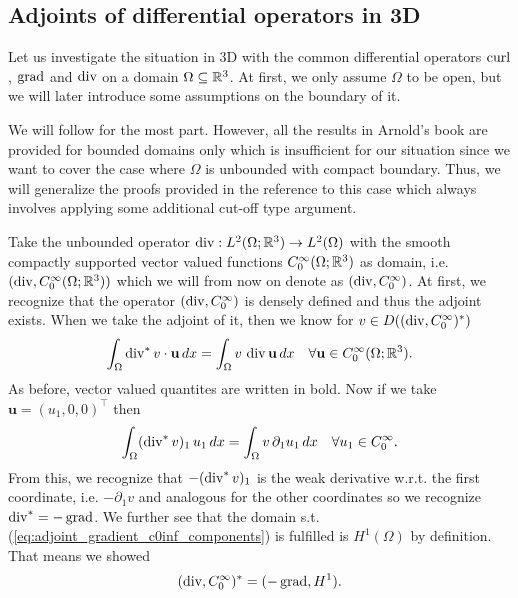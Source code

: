 \documentclass[../master_thesis.tex]{subfiles}
\begin{document}
\subsection{Adjoints of differential operators in 3D}\label{sec:adjoints_differential_operators_3d}

Let us investigate the situation in 3D with the common differential 
operators $\operatorname{curl}$, $\operatorname{grad}$ and $\operatorname{div}$ on a domain $\Omega \subseteq \mathbb{R}^3$. 
At first, we only assume  $\Omega$ to be open, but we will later 
introduce some assumptions on the boundary of it. 


We will follow \cite[Sec.\,3.4]{arnold} for the most part. However, all the results in Arnold's book 
are provided for bounded domains only which is insufficient for our situation since 
we want to cover the case where $\Omega$ is unbounded with compact boundary. Thus, 
we will generalize the proofs provided in the reference to this case which always involves 
applying some additional cut-off type argument.

Take the unbounded operator 
$\operatorname{div}: L^2(\Omega;\mathbb{R}^3) \rightarrow L^2(\Omega)$ with the smooth compactly supported 
vector valued functions
$C_0^\infty(\Omega;\mathbb{R}^3)$ as domain, i.e. $(\operatorname{div}, C_0^\infty(\Omega;\mathbb{R}^3))$ which 
we will from now on denote as $(\operatorname{div}, C_0^\infty)$. At first, we recognize that 
the operator $(\operatorname{div}, C_0^\infty)$ is densely defined and thus the adjoint exists.
When we take the adjoint of it, then we know for $v \in 
D((\operatorname{div}, C_0^\infty)^*)$
\begin{align*}
    \int_\Omega \operatorname{div} ^* v \cdot \mathbf{u} \, dx
    = \int_\Omega v \, \operatorname{div} \mathbf{u} \, dx \quad \forall 
    \mathbf{u} \in C_0^\infty(\Omega;\mathbb{R}^3).
\end{align*}
As before, vector valued quantites are written in bold.
Now if we take $\mathbf{u} = (u_1,0,0)^\top$ then 
\begin{align}
    \int_\Omega (\operatorname{div} ^* v)_1 \, u_1 \, dx
    = \int_\Omega v \, \partial_1 u_1 \, dx \quad 
        \forall u_1 \in C_0^\infty. \label{eq:adjoint_gradient_c0inf_components}
\end{align}
From this, we recognize that $-(\operatorname{div} ^* v)_1$ is the weak derivative w.r.t. the 
first coordinate, i.e. $-\partial_1 v$ and analogous for the other coordinates 
so we recognize $\operatorname{div}^* = -\operatorname{grad}$. We further see that the
domain s.t. (\ref{eq:adjoint_gradient_c0inf_components}) is fulfilled is $H^1(\Omega)$ 
by definition. That means we showed 
\begin{align}
    (\operatorname{div}, C_0^\infty)^* = (-\operatorname{grad}, H^1). \label{eq:adjoint_gradient_c0inf} 
\end{align}
\end{document}

